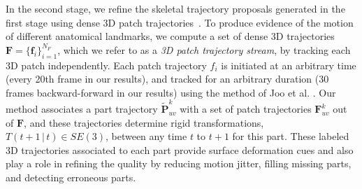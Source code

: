 

In the second stage, we refine the skeletal trajectory proposals generated in the first stage using dense 3D patch trajectories~\cite{Joo2014}. To produce evidence of the motion of different anatomical landmarks, we compute a set of dense 3D trajectories $\mathbf{F}=\{\mathbf{f}_i\}_{i=1}^{N_F}$, which we refer to as a \textit{3D patch trajectory stream}, by tracking each 3D patch independently. Each patch trajectory $f_i$ is initiated at an arbitrary time (every 20th frame in our results), and tracked for an arbitrary duration (30 frames backward-forward in our results) using the method of Joo et al. \cite{Joo2014}. Our method associates a part trajectory $\mathbf{\tilde{P}}^k_{uv}$ with a set of patch trajectories $\mathbf{F}_{uv}^k$ out of $\mathbf{F}$, and these trajectories determine rigid transformations, $T(t{+}1\,|\,t) \in SE(3) $, between any time $t$ to $t{+}1$ for this part. These labeled 3D trajectories associated to each part provide surface deformation cues and also play a role in refining the quality by reducing motion jitter, filling missing parts, and detecting erroneous parts.




